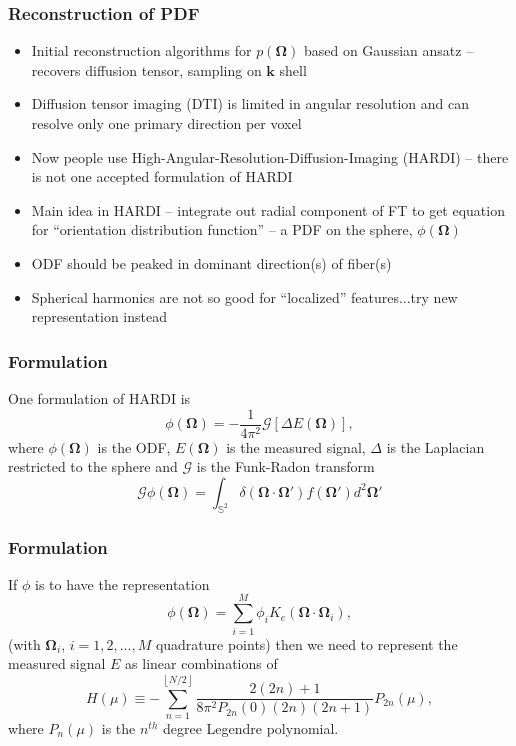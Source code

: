 \documentclass{beamer}
\begin{document}
  {
  \frametitle{Reconstruction of PDF} 
    \begin{itemize}
      \item{Initial reconstruction algorithms for $p\left(\boldsymbol{\Omega}\right)$ based on Gaussian ansatz -- recovers diffusion tensor, sampling on $\mathbf{k}$ shell}
      \item{Diffusion tensor imaging (DTI) is limited in angular resolution and can resolve only one primary direction per voxel}
      \item{Now people use High-Angular-Resolution-Diffusion-Imaging (HARDI) -- there is not one accepted formulation of HARDI}
      \item{Main idea in HARDI -- integrate out radial component of FT to get equation for ``orientation distribution function'' -- a PDF on the sphere, $\phi\left(\boldsymbol{\Omega}\right)$}
      \item{ODF should be peaked in dominant direction(s) of fiber(s)}
      \item{Spherical harmonics are not so good for ``localized'' features...try new representation instead}
    \end{itemize}
  }
  \frame
  {
    \frametitle{Formulation} 
    One formulation of HARDI is
    \begin{equation}
      \phi\left(\boldsymbol{\Omega}\right) = -\frac{1}{4\pi^2}\mathcal{G}\left[\Delta E\left(\boldsymbol{\Omega}\right) \right],  
    \end{equation}
    where $\phi\left(\boldsymbol{\Omega}\right)$ is the ODF, $E\left(\boldsymbol{\Omega}\right)$ is the measured signal, $\Delta$ is the Laplacian restricted to the sphere and $\mathcal{G}$ is the Funk-Radon transform
    \begin{equation}
      \mathcal{G}\phi\left(\boldsymbol{\Omega}\right) = \int_{\mathbb{S}^2} \delta\left(\boldsymbol{\Omega}\cdot\boldsymbol{\Omega}'\right)f\left(\boldsymbol{\Omega}'\right)d^2\boldsymbol{\Omega}'
    \end{equation}
 
  }
  \frame
  {
    \frametitle{Formulation} 
    If $\phi$ is to have the representation 
    \begin{equation}
      \phi\left(\boldsymbol{\Omega}\right) = \sum_{i=1}^M \phi_i K_e\left(\boldsymbol{\Omega}\cdot\boldsymbol{\Omega}_i\right),  
    \end{equation}
    (with $\boldsymbol{\Omega}_i$, $i=1,2,...,M$ quadrature points) then we need to represent the measured signal $E$ as linear combinations of
    \begin{equation}
      H\left(\mu\right)\equiv-\sum_{n=1}^{\left\lfloor N/2\right\rfloor }\frac{2\left(2n\right)+1}{8\pi^{2}P_{2n}\left(0\right)\left(2n\right)\left(2n+1\right)}P_{2n}\left(\mu\right),
    \end{equation}
    where $P_n\left(\mu\right)$ is the $n^{th}$ degree Legendre polynomial.
  }
\end{document}
